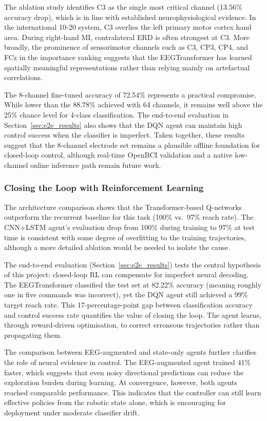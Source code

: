 \documentclass[12pt, a4paper]{article}
\begin{document}
The ablation study identifies C3 as the single most critical channel (13.56\% accuracy drop), which is in line with established neurophysiological evidence. In the international 10-20 system, C3 overlies the left primary motor cortex hand area. During right-hand MI, contralateral ERD is often strongest at C3. More broadly, the prominence of sensorimotor channels such as C3, CP3, CP4, and FCz in the importance ranking suggests that the EEGTransformer has learned spatially meaningful representations rather than relying mainly on artefactual correlations.

The 8-channel fine-tuned accuracy of 72.54\% represents a practical compromise. While lower than the 88.78\% achieved with 64 channels, it remains well above the 25\% chance level for 4-class classification. The end-to-end evaluation in Section~\ref{sec:e2e_results} also shows that the DQN agent can maintain high control success when the classifier is imperfect. Taken together, these results suggest that the 8-channel electrode set remains a plausible offline foundation for closed-loop control, although real-time OpenBCI validation and a native low-channel online inference path remain future work.

\subsubsection{Closing the Loop with Reinforcement Learning}

The architecture comparison shows that the Transformer-based Q-networks outperform the recurrent baseline for this task (100\% vs.~97\% reach rate). The CNN+LSTM agent's evaluation drop from 100\% during training to 97\% at test time is consistent with some degree of overfitting to the training trajectories, although a more detailed ablation would be needed to isolate the cause.

The end-to-end evaluation (Section~\ref{sec:e2e_results}) tests the central hypothesis of this project: closed-loop RL can compensate for imperfect neural decoding. The EEGTransformer classified the test set at 82.22\% accuracy (meaning roughly one in five commands was incorrect), yet the DQN agent still achieved a 99\% target reach rate. This 17-percentage-point gap between classification accuracy and control success rate quantifies the value of closing the loop. The agent learns, through reward-driven optimisation, to correct erroneous trajectories rather than propagating them.

The comparison between EEG-augmented and state-only agents further clarifies the role of neural evidence in control. The EEG-augmented agent trained 41\% faster, which suggests that even noisy directional predictions can reduce the exploration burden during learning. At convergence, however, both agents reached comparable performance. This indicates that the controller can still learn effective policies from the robotic state alone, which is encouraging for deployment under moderate classifier drift.
\end{document}
